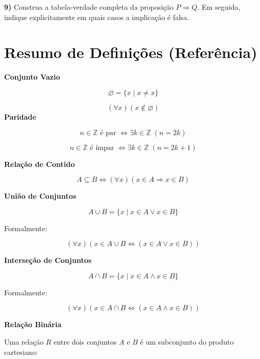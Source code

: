 \documentclass[12pt,a4paper]{article}
\newcommand{\resposta}[1]{
\noindent
\framebox[\textwidth]{
\begin{minipage}{0.98\textwidth}
\vspace{#1}
\end{minipage}
}
}
\begin{document}
\vspace{0.8cm}

\textbf{9)} Construa a tabela-verdade completa da proposição $P \Rightarrow Q$. Em seguida, indique explicitamente em quais casos a implicação é falsa.

\vspace{0.2cm}
\resposta{12cm}

\section*{Resumo de Definições (Referência)}

\textbf{Conjunto Vazio}


\[
\varnothing = \{x \mid x \neq x\}
\]


\[
(\forall x)(x \notin \varnothing)
\]
\textbf{Paridade}

\[
n \in \mathbb{Z} \text{ é par } \Leftrightarrow \exists k \in \mathbb{Z} \; (n = 2k)
\]

\[
n \in \mathbb{Z} \text{ é ímpar } \Leftrightarrow \exists k \in \mathbb{Z} \; (n = 2k + 1)
\]

\vspace{0.3cm}

\textbf{Relação de Contido}

\[
A \subseteq B \Leftrightarrow (\forall x)(x \in A \Rightarrow x \in B)
\]

\vspace{0.3cm}

\textbf{União de Conjuntos}

\[
A \cup B = \{x \mid x \in A \lor x \in B\}
\]

Formalmente:

\[
(\forall x)(x \in A \cup B \Leftrightarrow (x \in A \lor x \in B))
\]

\vspace{0.3cm}

\textbf{Interseção de Conjuntos}

\[
A \cap B = \{x \mid x \in A \land x \in B\}
\]

Formalmente:

\[
(\forall x)(x \in A \cap B \Leftrightarrow (x \in A \land x \in B))
\]

\vspace{0.3cm}

\textbf{Relação Binária}

Uma relação $R$ entre dois conjuntos $A$ e $B$ é um subconjunto do produto cartesiano:
\end{document}

